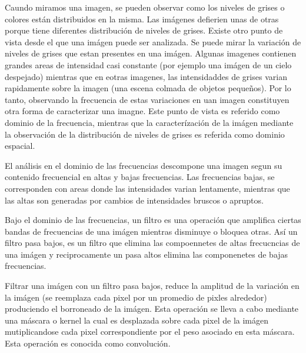 Caundo miramos una imagen, se pueden observar como los niveles de grises o colores están distribuidos en la misma. Las imágenes defierien unas de otras porque tiene diferentes distribución de niveles de grises. Existe otro punto de vista desde el que una imágen puede ser analizada. Se puede mirar la variación de niveles de grises que estan presentes en una imágen. Algunas imagenes contienen grandes areas de intensidad casi constante (por ejemplo una imágen de un cielo despejado) mientras que en eotras imagenes, las intensidaddes de grises varian rapidamente sobre la imagen (una escena colmada de objetos pequeños). Por lo tanto, observando la frecuencia de estas variaciones en uan imagen constituyen otra forma de caracterizar una imagne. Este punto de vista es referido como dominio de la frecuencia, mientras que la caracterízación de la imágen mediante la observación de la distribución de niveles de grises es referida como dominio espacial.

El análisis en el dominio de las frecuencias descompone una imagen segun su contenido frecuencial en altas y bajas frecuencias. Las frecuencias bajas, se corresponden con areas donde las intensidades varian lentamente, mientras que las altas son generadas por cambios de intensidades bruscos o apruptos. 

Bajo el dominio de las frecuencias, un filtro es una operación que amplifica ciertas bandas de frecuencias de una imágen mientras disminuye o bloquea otras. Así un filtro pasa bajos, es un filtro que elimina las compoennetes de altas frecucncias de una imágen y reciprocamente un pasa altos elimina las componenetes de bajas frecuencias.

Filtrar una imágen con un filtro pasa bajos, reduce la amplitud de la variación en la imágen (se reemplaza cada pixel por un promedio de pixles alrededor) produciendo el borroneado de la imágen. Esta operación se lleva a cabo mediante una máscara o kernel la cual es desplazada sobre cada pixel de la imágen mutiplicandose cada pixel correspondiente por el peso asociado en esta máscara. Esta operación es conocida como convolución.






